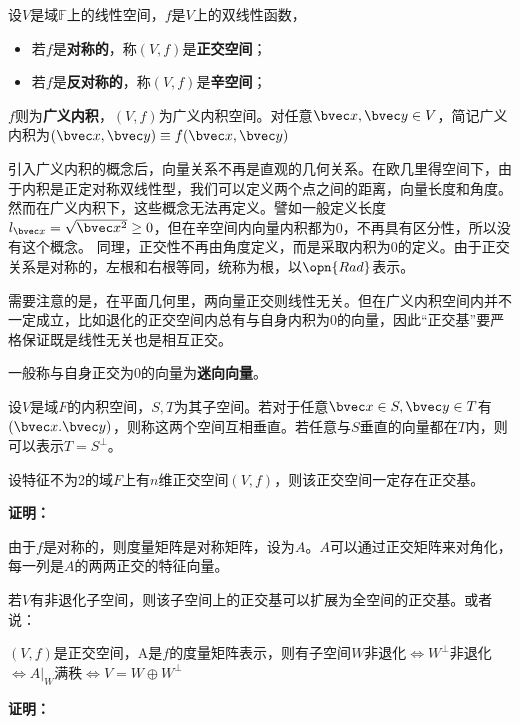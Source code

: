 
\begin{definition}{}
设$V$是域$\mathbb F$上的线性空间，$f$是$V$上的双线性函数，
\begin{itemize}
\item 若$f$是\textbf{对称的}，称$(V,f)$是\textbf{正交空间}；
\item 若$f$是\textbf{反对称的}，称$(V,f)$是\textbf{辛空间}；
\end{itemize}
$f$则为\textbf{广义内积}，$(V,f)$为广义内积空间。对任意$\bvec x,\bvec y\in V$，简记广义内积为$(\bvec x,\bvec y)\equiv f(\bvec x,\bvec y)$
\end{definition}
引入广义内积的概念后，向量关系不再是直观的几何关系。在欧几里得空间下，由于内积是正定对称双线性型，我们可以定义两个点之间的距离，向量长度和角度。然而在广义内积下，这些概念无法再定义。譬如一般定义长度$l_{\bvec x}=\sqrt{\bvec x^2}\ge 0$，但在辛空间内向量内积都为0，不再具有区分性，所以没有这个概念。
同理，正交性不再由角度定义，而是采取内积为$0$的定义。由于正交关系是对称的，左根和右根等同，统称为根，以$\opn{Rad}$表示。

需要注意的是，在平面几何里，两向量正交则线性无关。但在广义内积空间内并不一定成立，比如退化的正交空间内总有与自身内积为0的向量，因此“正交基”要严格保证既是线性无关也是相互正交。

一般称与自身正交为$0$的向量为\textbf{迷向向量}。

\begin{definition}{}
设$V$是域$F$的内积空间，$S,T$为其子空间。若对于任意$\bvec x\in S,\bvec  y\in T$有$(\bvec x.\bvec y)$，则称这两个空间互相垂直。若任意与$S$垂直的向量都在$T$内，则可以表示$T=S^{\bot}$。
\end{definition}
\begin{theorem}{}
设特征不为2的域$F$上有$n$维正交空间$(V,f)$，则该正交空间一定存在正交基。
\end{theorem}
\textbf{证明：}

由于$f$是对称的，则度量矩阵是对称矩阵，设为$A$。$A$可以通过正交矩阵来对角化，每一列是$A$的两两正交的特征向量。

若$V$有非退化子空间，则该子空间上的正交基可以扩展为全空间的正交基。或者说：

\begin{theorem}{}\label{the_OrSp_1}
$(V,f)$是正交空间，A是$f$的度量矩阵表示，则有子空间$W$非退化$\Longleftrightarrow  W^{\bot}$非退化$\Longleftrightarrow A|_{W}$满秩$\Longleftrightarrow V=W\oplus W^{\bot} $
\end{theorem}
\textbf{证明：}

